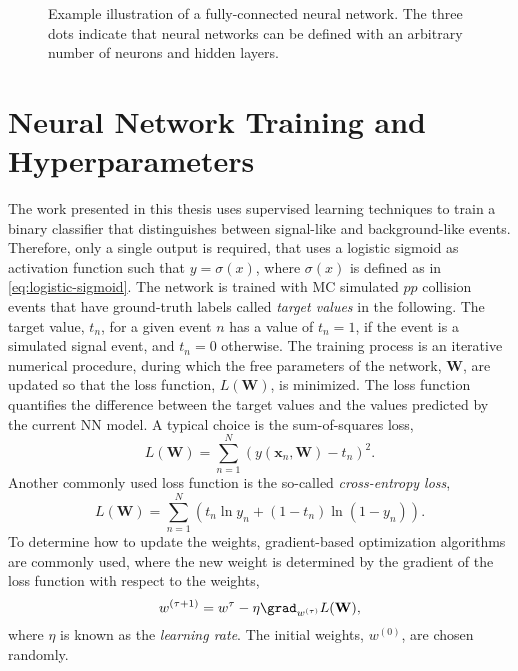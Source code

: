 \begin{figure}[t]
    \caption{Example illustration of a fully-connected neural network. The three dots indicate that neural networks can be defined with an arbitrary number of neurons and hidden layers.}
    \label{fig:neural-net}
\end{figure}




\section{Neural Network Training and Hyperparameters}

The work presented in this thesis uses supervised learning techniques to train a binary classifier that distinguishes between signal-like and background-like events. 
Therefore, only a single output is required, that uses a logistic sigmoid as activation function such that $y = \sigma(x)$, where $\sigma(x)$ is defined as in \cref{eq:logistic-sigmoid}.
The network is trained with MC simulated $pp$ collision events that have ground-truth labels called \emph{target values} in the following. The target value, $t_n$, for a given event $n$ has a value of $t_n = 1$, if the event is a simulated signal event, and $t_n = 0$ otherwise.
The training process is an iterative numerical procedure, during which the free parameters of the network, $\mathbf{W}$, are updated so that the loss function, $L(\mathbf{W})$, is minimized.
The loss function quantifies the difference between the target values and the values predicted by the current NN model. A typical choice is the sum-of-squares loss,
\begin{equation}
   L(\mathbf{W}) = \sum _{n=1}^{N}\left( y(\mathbf{x}_n, \mathbf{W})-t_n \right)^{2}.
\end{equation}
Another commonly used loss function is the so-called \emph{cross-entropy loss},
\begin{equation}
    L(\mathbf{W}) = \sum _{n=1}^{N}\left( t_n \ln y_n + ( 1 - t_n) \ln (1 - y_n) \right).
\end{equation}
To determine how to update the weights, gradient-based optimization algorithms are commonly used, where the new weight is determined by the gradient of the loss function with respect to the weights, 
\begin{equation}
    w^{(\tau+1)} = w^\tau - \eta \grad_{w^{(\tau)}} L(\mathbf{W}),
\end{equation}
where $\eta$ is known as the \emph{learning rate}. 
The initial weights, $w^{(0)}$, are chosen randomly.

